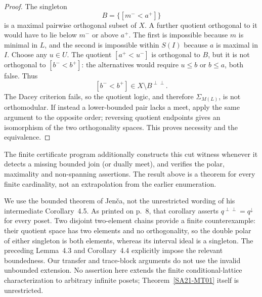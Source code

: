 \begin{proof}
The singleton
\[
 B=\{[m^-<a^+]\}
\]
is a maximal pairwise orthogonal subset of $X$. A further quotient
orthogonal to it would have to lie below $m^-$ or above $a^+$.
The first is impossible because $m$ is minimal in $L$, and the
second is impossible within $S(I)$ because $a$ is maximal in $I$.
Choose any $u\in U$. The quotient $[a^+<u^-]$ is orthogonal to
$B$, but it is not orthogonal to $[b^-<b^+]$: the alternatives would
require $u\le b$ or $b\le a$, both false. Thus
\[
 [b^-<b^+]\in X\setminus B^{\perp\perp}.
\]
The Dacey criterion fails, so the quotient logic, and therefore
$\Sigma_{M(L)}$, is not orthomodular. If instead a lower-bounded
pair lacks a meet, apply the same argument to the opposite order;
reversing quotient endpoints gives an isomorphism of the two
orthogonality spaces. This proves necessity and the equivalence.
\end{proof}

The finite certificate program additionally constructs this cut witness
whenever it detects a missing bounded join (or dually meet), and verifies
the polar, maximality and non-spanning assertions. The result above is
a theorem for every finite cardinality, not an extrapolation from the
earlier enumeration.

\begin{remark}
\label{SA21-MT04}
We use the bounded theorem of Jen\v ca, not the unrestricted wording
of his intermediate Corollary~4.5. As printed on p.~8, that corollary
asserts $q^{\perp\perp}=q^{\downarrow}$ for every poset. Two disjoint
two-element chains provide a finite counterexample: their quotient
space has two elements and no orthogonality, so the double polar of
either singleton is both elements, whereas its interval ideal is a
singleton. The preceding Lemma~4.3 and Corollary~4.4 explicitly impose
the relevant boundedness. Our transfer and trace-block arguments do
not use the invalid unbounded extension. No assertion here extends
the finite conditional-lattice characterization to arbitrary infinite
posets; Theorem~\ref{SA21-MT01} itself is unrestricted.
\end{remark}

